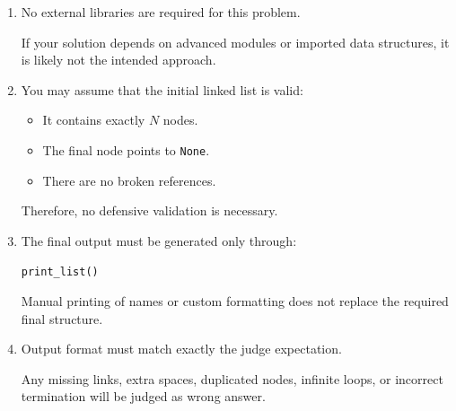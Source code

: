 \documentclass[11pt,a4paper]{article}
\begin{document}
\begin{enumerate}
\item No external libraries are required for this problem.

If your solution depends on advanced modules or imported data structures, it is likely not the intended approach.

\item You may assume that the initial linked list is valid:

\begin{itemize}
    \item It contains exactly \(N\) nodes.
    \item The final node points to \texttt{None}.
    \item There are no broken references.
\end{itemize}

Therefore, no defensive validation is necessary.

\item The final output must be generated only through:

\lstinline[style=pythonstyle]|print_list()|

Manual printing of names or custom formatting does not replace the required final structure.

\item Output format must match exactly the judge expectation.

Any missing links, extra spaces, duplicated nodes, infinite loops, or incorrect termination will be judged as wrong answer.

\end{enumerate}
\end{document}
